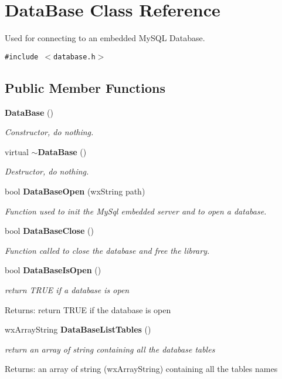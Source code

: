 \section{Data\-Base Class Reference}
\label{class_data_base}
Used for connecting to an embedded My\-SQL Database.  


{\tt \#include $<$database.h$>$}

\subsection*{Public Member Functions}
\begin{CompactItemize}
\item 
{\bf Data\-Base} ()
\begin{CompactList}\small\item\em Constructor, do nothing. \item\end{CompactList}\item 
virtual {\bf $\sim$Data\-Base} ()
\begin{CompactList}\small\item\em Destructor, do nothing. \item\end{CompactList}\item 
bool {\bf Data\-Base\-Open} (wx\-String path)
\begin{CompactList}\small\item\em Function used to init the My\-Sql embedded server and to open a database. \item\end{CompactList}\item 
bool {\bf Data\-Base\-Close} ()
\begin{CompactList}\small\item\em Function called to close the database and free the library. \item\end{CompactList}\item 
bool {\bf Data\-Base\-Is\-Open} ()\label{class_data_base_0c190151b6e1e0b822b4d8f410ca0df0}

\begin{CompactList}\small\item\em return TRUE if a database is open \begin{Desc}
\item[Returns:]return TRUE if the database is open \end{Desc}
\item\end{CompactList}\item 
wx\-Array\-String {\bf Data\-Base\-List\-Tables} ()
\begin{CompactList}\small\item\em return an array of string containing all the database tables \begin{Desc}
\item[Returns:]an array of string (wx\-Array\-String) containing all the tables names \end{Desc}
\item\end{CompactList}\end{CompactItemize}


